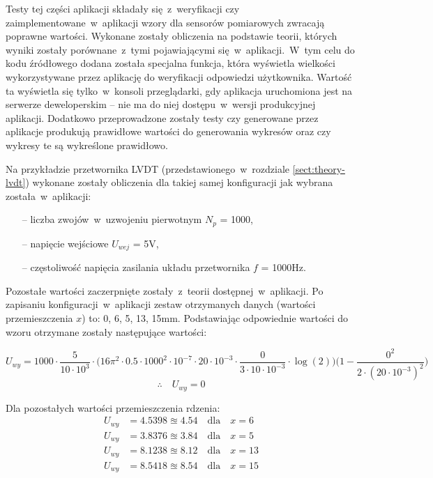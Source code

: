 Testy tej części aplikacji składały się~z~weryfikacji czy zaimplementowane~w~aplikacji wzory dla
sensorów pomiarowych zwracają poprawne wartości. Wykonane zostały obliczenia na podstawie teorii,
których wyniki zostały porównane~z~tymi pojawiającymi się~w~aplikacji.~W~tym celu do kodu źródłowego
dodana została specjalna funkcja, która wyświetla wielkości wykorzystywane przez aplikację do
weryfikacji odpowiedzi użytkownika. Wartość ta wyświetla się tylko~w~konsoli przeglądarki, gdy
aplikacja uruchomiona jest na serwerze deweloperskim -- nie ma do niej dostępu~w~wersji produkcyjnej
aplikacji. Dodatkowo przeprowadzone zostały testy czy generowane przez aplikacje produkują
prawidłowe wartości do generowania wykresów oraz czy wykresy te są wykreślone prawidłowo.

Na przykładzie przetwornika LVDT (przedstawionego~w~rozdziale
\ref{sect:theory-lvdt}) wykonane zostały obliczenia dla takiej samej konfiguracji jak wybrana
została~w~aplikacji:
\begin{itemize}
  \item [--]  liczba zwojów~w~uzwojeniu pierwotnym $N_p$ = 1000,
  \item [--]  napięcie wejściowe $U_{wej}$ = 5V,
  \item [--]  częstoliwość napięcia zasilania układu przetwornika $f$ = 1000Hz.
\end{itemize}
Pozostałe wartości zaczerpnięte zostały~z~teorii dostępnej~w~aplikacji. Po zapisaniu
konfiguracji~w~aplikacji zestaw otrzymanych danych (wartości przemieszczenia $x$) to: 0, 6, 5, 13,
15mm. Podstawiając odpowiednie wartości do wzoru otrzymane zostały następujące wartości:

\begin{equation*}
  U_{wy} =1000\cdot \frac{5}{10\cdot 10^3}\cdot\bigg(16\pi^2\cdot 0.5\cdot 1000^2\cdot
  10^{-7}\cdot 20\cdot 10^{-3}\cdot\frac{0}{3\cdot 10\cdot 10^{-3}}\cdot\log{(2)}\bigg)
  \bigg(1-\frac{0^2}{2\cdot (20\cdot 10^{-3})^2}\bigg)
\end{equation*}
\begin{equation*}
  \therefore\quad U_{wy} = 0
\end{equation*}

Dla pozostałych wartości przemieszczenia rdzenia:
\begin{align*}
  U_{wy} & =4.5398\approxeq 4.54\quad\text{dla}\quad x=6  \\
  U_{wy} & =3.8376\approxeq 3.84\quad\text{dla}\quad x=5  \\
  U_{wy} & =8.1238\approxeq 8.12\quad\text{dla}\quad x=13 \\
  U_{wy} & =8.5418\approxeq 8.54\quad\text{dla}\quad x=15
\end{align*}


